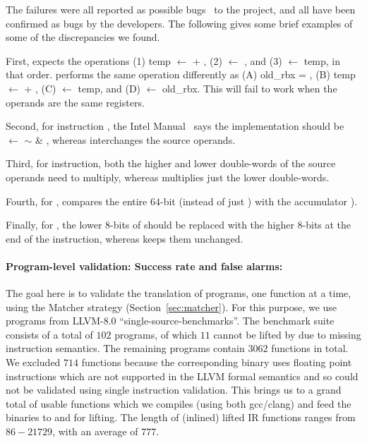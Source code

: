 The \sivFail failures were all reported 
as possible bugs~\cite{Suppl} to the \mcsema project, and all \sivFail 
have been confirmed as bugs by the \mcsema developers.
%
The following gives some brief examples of some of the
discrepancies we found.

First,  expects the operations 
(1) temp $\leftarrow$  + , (2)  
$\leftarrow$ , and (3)  $\leftarrow$ temp, in that 
order. \mcsema performs the same operation differently as (A) old\_rbx = 
, (B) temp $\leftarrow$  + , (C)  
$\leftarrow$ temp, and (D)  
$\leftarrow$ old\_rbx. This will fail to  work when the operands 
are the same registers. 

Second, for instruction , the Intel 
Manual~\cite{IntelManual} says the implementation should be   
$\leftarrow$ $\sim$ \& , whereas \mcsema 
interchanges the source operands. 

Third, for  instruction, both the higher and 
lower double-words of the source operands need to multiply, whereas 
\mcsema multiplies just the lower double-words.

Fourth, for , \mcsema compares the entire $64$-bit 
 (instead of just ) with the accumulator 
).

Finally, for , the lower $8$-bits of  
should be replaced with the higher $8$-bits at the end of the instruction, whereas 
\mcsema keeps them unchanged.


%
\paragraph{Program-level validation: Success rate and false alarms:}
%
The goal here is to validate the translation of programs, one function at a 
time, using the Matcher strategy (Section~\ref{sec:matcher}). For this purpose, 
we use programs from LLVM-8.0 ``single-source-benchmarks''. The benchmark suite
consists of a total of $102$ programs, of which $11$ cannot be lifted by 
\mcsema due to missing instruction semantics. The remaining programs 
contain $3062$ functions in total. We excluded $714$ functions because  the 
corresponding binary uses floating point instructions which are not supported
in the LLVM formal semantics and so could not be validated using single 
instruction validation. This 
brings us to a grand total of \plvT usable functions which we compiles (using 
both gcc/clang) and feed the binaries to \compd and \mcsema for lifting. The 
length of (inlined) lifted IR functions ranges from $86-21729$, with an average 
of $777$.

